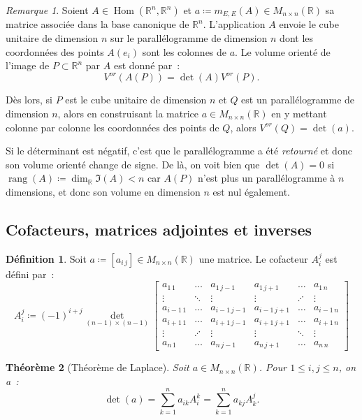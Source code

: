 \documentclass{article}
\DeclareMathOperator{\rang}{rang}
\DeclareMathOperator{\Hom}{Hom}
\newcommand{\R}{\mathbb R}
\newcommand{\M}[3]{M_{#1 \times #2}(#3)}
\newcommand{\Vor}{V^{or}}
\newtheorem{thm}{Théorème}[section]
\theoremstyle{definition}
\newtheorem{déf}[thm]{Définition}
\theoremstyle{remark}
\newtheorem*{rmq}{Remarque}
\begin{document}
		\begin{rmq} Soient $A \in \Hom(\R^n, \R^n)$ et $a \coloneqq m_{E, E}(A) \in \M nn\R$ sa matrice associée dans la base canonique de $\R^n$. L'application $A$
		envoie le cube unitaire de dimension $n$ sur le parallélogramme de dimension $n$ dont les coordonnées des points $A(e_i)$ sont les colonnes de $a$.
		Le volume orienté de l'image de $P \subset \R^n$ par $A$ est donné par~: \[\Vor(A(P)) = \det(A)\Vor(P).\]

		Dès lors, si $P$ est le cube unitaire de dimension $n$ et $Q$ est un parallélogramme de dimension $n$, alors en construisant la matrice $a \in \M nn\R$ en
		y mettant colonne par colonne les coordonnées des points de $Q$, alors $\Vor(Q) = \det(a)$.

		Si le déterminant est négatif, c'est que le parallélogramme a été \textit{retourné} et donc son volume orienté change de signe.
		De là, on voit bien que $\det(A) = 0$ si $\rang(A) \coloneqq \dim_\R\Im(A) < n$ car $A(P)$ n'est plus un parallélogramme à $n$ dimensions, et donc son volume en
		dimension $n$ est nul également. \end{rmq}

	\subsection{Cofacteurs, matrices adjointes et inverses}
		\begin{déf} Soit $a \coloneqq [a_{i\,j}] \in \M nn\R$ une matrice. Le cofacteur $A_i^j$ est défini par~:
		\[A_i^j \coloneqq (-1)^{i+j}\det_{(n-1)\times(n-1)}
		\begin{bmatrix}
			a_{1\,1}   & \ldots  & a_{1\,j-1}   & a_{1\,j+1}   & \ldots  & a_{1\,n}   \\
			  \vdots   & \ddots  &    \vdots    &   \vdots     & \iddots & \vdots     \\
			a_{i-1\,1} & \ldots  & a_{i-1\,j-1} & a_{i-1\,j+1} & \ldots  & a_{i-1\,n} \\
			a_{i+1\,1} & \ldots  & a_{i+1\,j-1} & a_{i+1\,j+1} & \ldots  & a_{i+1\,n} \\
			  \vdots   & \iddots &     \vdots   &    \vdots    & \ddots  & \vdots     \\
			a_{n\,1}   & \ldots  & a_{n\,j-1}   & a_{n\,j+1}   & \ldots  & a_{n\,n}
		\end{bmatrix}
		\] \end{déf}

		\begin{thm}[Théorème de Laplace]\label{thmLaplace} Soit $a \in \M nn\R$. Pour $1 \leq i, j \leq n$, on a~:
		\[\det(a) = \sum_{k=1}^na_{ik}A_i^k = \sum_{k=1}^na_{kj}A_k^j.\] \end{thm}
\end{document}
